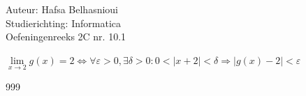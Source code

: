 \documentclass[a4paper]{article}
\begin{document}
\noindent \large Auteur: Hafsa Belhasnioui \\
\noindent \large Studierichting: Informatica\\
\noindent \large Oefeningenreeks 2C nr. 10.1\\

\medskip

\normalsize

$\lim\limits_{x \rightarrow 2} g(x) = 2 \Leftrightarrow \forall \varepsilon > 0, \exists \delta > 0 : 0 < |x + 2| < \delta \Rightarrow |g(x) - 2| < \varepsilon$


\begin{thebibliography}{999}
\end{thebibliography}
\end{document}
